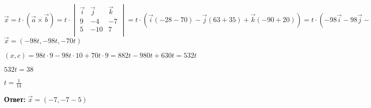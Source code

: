 $\vec x = t \cdot (\vec a \times \vec b) =
t \cdot \begin{vmatrix}
            \vec{i} & \vec{j} & \vec{k} \\
            9 & -4 & -7 \\
            5 & -10 & 7 \\
        \end{vmatrix} = t \cdot (\vec i (-28 - 70) - \vec j (63 + 35) + \vec k (-90 + 20)) = t \cdot (-98 \vec i - 98 \vec j - 70 \vec k) $ \\

$\vec x = (-98 t, -98 t, -70 t)$

$(x, c) = 98t \cdot 9 - 98t \cdot 10 + 70t \cdot 9 = 882t - 980t + 630t = 532t$

$532t = 38$

$t = \frac{1}{14}$

\textbf{Ответ:} $\vec x = (-7, -7 -5)$

